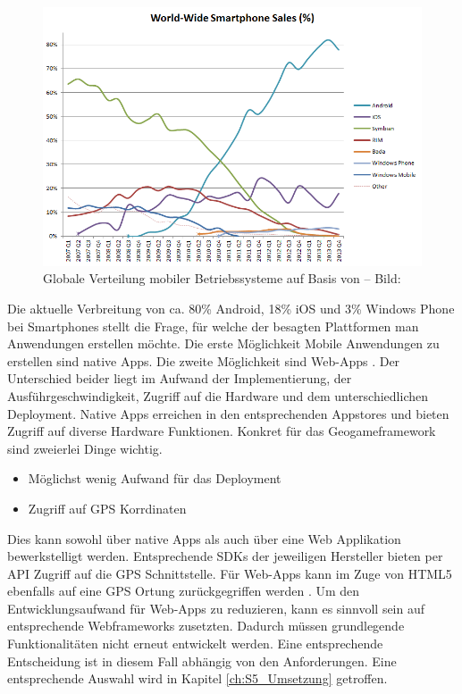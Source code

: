 \begin{figure}[H]
\begin{center}
\includegraphics[width=140mm]{images/ch4_img02_marketshare.png}
\caption{Globale Verteilung mobiler Betriebssysteme auf Basis von \textcite{Gartner.2013} -- Bild: \cite{Wikipedia.2014}}
\label{img:ch4_img02_marketshare}
\end{center}
\end{figure}

Die aktuelle Verbreitung von ca. 80\% Android, 18\% iOS und 3\% Windows Phone bei Smartphones stellt die Frage, für welche der besagten Plattformen man Anwendungen erstellen möchte.
Die erste Möglichkeit Mobile Anwendungen zu erstellen sind native Apps. Die zweite Möglichkeit sind Web-Apps \cite{Charland.2011}.
Der Unterschied beider liegt im Aufwand der Implementierung, der Ausführgeschwindigkeit, Zugriff auf die Hardware und dem unterschiedlichen Deployment.
Native Apps erreichen in den entsprechenden Appstores und bieten Zugriff auf diverse Hardware Funktionen.
Konkret für das Geogameframework sind zweierlei Dinge wichtig.

\begin{itemize}
\item Möglichst wenig Aufwand für das Deployment
\item Zugriff auf GPS Korrdinaten
\end{itemize}

Dies kann sowohl über native  Apps als auch über eine Web Applikation bewerkstelligt werden. Entsprechende SDKs der jeweiligen Hersteller bieten per API Zugriff auf die GPS Schnittstelle. Für Web-Apps kann im Zuge von HTML5 ebenfalls auf eine GPS Ortung zurückgegriffen werden \cite{Holdener.2011}. Um den Entwicklungsaufwand für Web-Apps zu reduzieren, kann es sinnvoll sein auf entsprechende Webframeworks zusetzten. Dadurch müssen grundlegende Funktionalitäten nicht erneut entwickelt werden.
Eine entsprechende Entscheidung ist in diesem Fall abhängig von den Anforderungen. Eine entsprechende Auswahl wird in Kapitel \ref{ch:S5_Umsetzung} getroffen.

